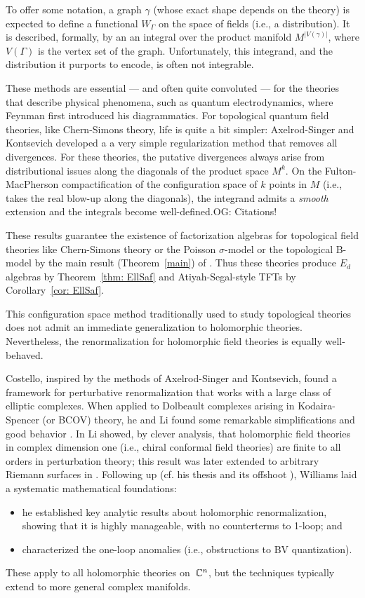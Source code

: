 \documentclass[11pt]{amsart}
\def\owen#1{{\textcolor{violet!50!black}{OG: {#1}}}}
\begin{document}
To offer some notation, a graph $\gamma$ (whose exact shape depends on the theory) is expected to define a functional $W_\Gamma$ on the space of fields (i.e., a distribution).
It is described, formally, by an an integral over the product manifold $M^{|V(\gamma)|}$,  
where $V(\Gamma)$ is the vertex set of the graph.
Unfortunately, this integrand, and the distribution it purports to encode, is often not integrable.

These methods are essential --- and often quite convoluted --- for the theories that describe physical phenomena, 
such as quantum electrodynamics,
where Feynman first introduced his diagrammatics.
For topological quantum field theories, like Chern-Simons theory,
life is quite a bit simpler: Axelrod-Singer and Kontsevich developed a a very simple regularization method that removes all divergences.
For these theories, the putative divergences always arise from distributional issues along the diagonals of the product space $M^k$.
On the Fulton-MacPherson compactification of the configuration space of $k$ points in $M$ (i.e., takes the real blow-up along the diagonals),
the integrand admits a {\em smooth} extension and the integrals become well-defined.\owen{Citations!}

These results guarantee the existence of factorization algebras for topological field theories like Chern-Simons theory or the Poisson $\sigma$-model or the topological B-model by the main result (Theorem~\ref{main}) of \cite{CG2}.
Thus these theories produce $E_d$ algebras by Theorem~\ref{thm: EllSaf} and Atiyah-Segal-style TFTs by Corollary~\ref{cor: EllSaf}.

This configuration space method traditionally used to study topological theories does not admit an immediate generalization to holomorphic theories.
Nevertheless, the renormalization for holomorphic field theories is equally well-behaved.

Costello, inspired by the methods of Axelrod-Singer and Kontsevich,
found a framework for perturbative renormalization that works with a large class of elliptic complexes.
When applied to Dolbeault complexes arising in Kodaira-Spencer (or BCOV) theory, 
he and Li found some remarkable simplifications and good behavior \cite{CLbcov}.
In \cite{LiVertex} Li showed, by clever analysis, that holomorphic field theories in complex dimension one (i.e., chiral conformal field theories) are finite to all orders in perturbation theory; 
this result was later extended to arbitrary Riemann surfaces in \cite{LiZhou}.
Following up (cf. his thesis \cite{BWthesis} and its offshoot \cite{Wrenorm}), Williams laid a systematic mathematical foundations:
\begin{itemize}
\item he established key analytic results about holomorphic renormalization, 
showing that it is highly manageable, with no counterterms to 1-loop; and
\item characterized the one-loop anomalies  (i.e., obstructions to BV quantization).
\end{itemize}
These apply to all holomorphic theories on~$\mathbb C^n$,
but the techniques typically extend to more general complex manifolds.
\end{document}
